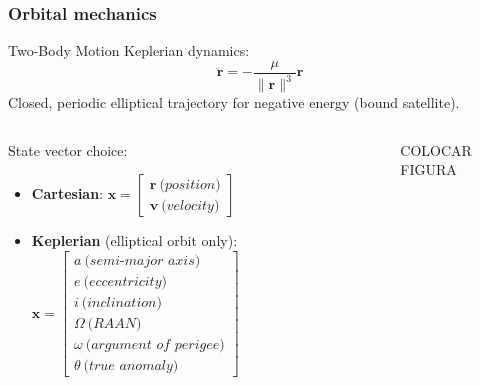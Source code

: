 \documentclass{beamer}
\begin{document}
\begin{frame}
    \frametitle{Orbital mechanics}

    \begin{block}{Two-Body Motion}
        Keplerian dynamics:
        \begin{equation}
            \ddot{\mathbf{r}} = - \frac{\mu}{\lVert \mathbf{r} \rVert^3} \mathbf{r}
        \end{equation}
        Closed, periodic elliptical trajectory for negative energy (bound satellite).
    \end{block}
    \begin{columns}
        \begin{column}{0.5\linewidth}
            State vector choice:
            \begin{itemize}
                \item \textbf{Cartesian}: \(\mathbf{x} = \begin{bmatrix}
                    \mathbf{r}\ \textit{(position)} \\ \mathbf{v}\ \textit{(velocity)} 
                \end{bmatrix}\)
                \item \textbf{Keplerian} (elliptical orbit only): \(\mathbf{x} = \begin{bmatrix}
                    a\ \textit{(semi-major axis)}\\ 
                    e\ \textit{(eccentricity)} \\ 
                    i\ \textit{(inclination)} \\ \Omega\ \textit{(RAAN)} \\ \omega\ \textit{(argument of perigee)} \\ \theta\ \textit{(true anomaly)}
                \end{bmatrix}\)
            \end{itemize}
        \end{column}
        \begin{column}{0.5\linewidth}
            COLOCAR FIGURA
        \end{column}
    \end{columns}
\end{frame}
\end{document}
